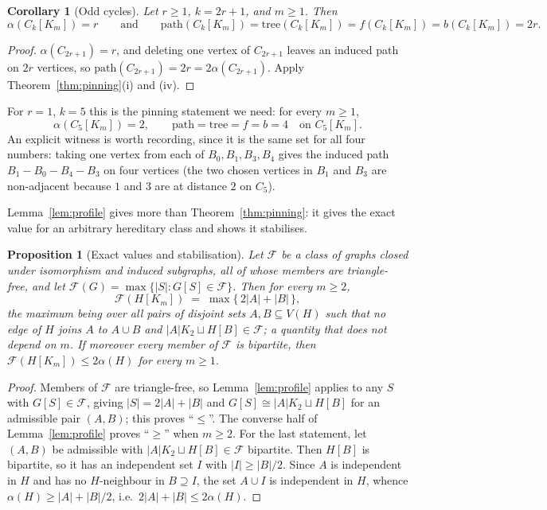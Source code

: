\documentclass[10pt,a4paper]{article}
\theoremstyle{plain}
\newtheorem{proposition}[theorem]{Proposition}
\newtheorem{corollary}[theorem]{Corollary}
\theoremstyle{definition}
\newcommand{\ind}{\alpha}
\newcommand{\forestnum}{f}
\newcommand{\bipnum}{b}
\newcommand{\treenum}{\mathrm{tree}}
\newcommand{\pathnum}{\mathrm{path}}
\newcommand{\blow}[2]{#1[K_{#2}]}
\begin{document}
\begin{corollary}[Odd cycles]\label{cor:oddcycle}
Let $r \ge 1$, $k = 2r+1$, and $m \ge 1$. Then
\[
\ind(C_k[K_m]) = r
\qquad\text{and}\qquad
\pathnum(C_k[K_m]) = \treenum(C_k[K_m]) = \forestnum(C_k[K_m]) = \bipnum(C_k[K_m]) = 2r .
\]
\end{corollary}

\begin{proof}
$\ind(C_{2r+1}) = r$, and deleting one vertex of $C_{2r+1}$ leaves an induced path on $2r$
vertices, so $\pathnum(C_{2r+1}) = 2r = 2\ind(C_{2r+1})$. Apply Theorem~\ref{thm:pinning}(i)
and (iv).
\end{proof}

For $r = 1$, $k = 5$ this is the pinning statement we need: for every $m \ge 1$,
\begin{equation}\label{eq:pin5}
\ind(\blow{C_5}{m}) = 2,
\qquad
\pathnum = \treenum = \forestnum = \bipnum = 4 \quad\text{on } \blow{C_5}{m}.
\end{equation}
An explicit witness is worth recording, since it is the same set for all four numbers: taking
one vertex from each of $B_0, B_1, B_3, B_4$ gives the induced path
$B_1 - B_0 - B_4 - B_3$ on four vertices (the two chosen vertices in $B_1$ and $B_3$ are
non-adjacent because $1$ and $3$ are at distance $2$ on $C_5$).

Lemma~\ref{lem:profile} gives more than Theorem~\ref{thm:pinning}: it gives the exact value for
an arbitrary hereditary class and shows it stabilises.

\begin{proposition}[Exact values and stabilisation]\label{prop:exact}
Let $\mathcal{F}$ be a class of graphs closed under isomorphism and induced subgraphs, all of
whose members are triangle-free, and let
$\mathcal{F}(G) = \max\{|S| : G[S] \in \mathcal{F}\}$. Then for every $m \ge 2$,
\[
\mathcal{F}(H[K_m]) \;=\; \max\big\{\, 2|A| + |B| \,\big\},
\]
the maximum being over all pairs of disjoint sets $A,B \subseteq V(H)$ such that no edge of $H$
joins $A$ to $A \cup B$ and $|A|K_2 \sqcup H[B] \in \mathcal{F}$;
a quantity that does not depend on $m$. If moreover every member of $\mathcal{F}$ is bipartite,
then $\mathcal{F}(H[K_m]) \le 2\ind(H)$ for every $m \ge 1$.
\end{proposition}

\begin{proof}
Members of $\mathcal{F}$ are triangle-free, so Lemma~\ref{lem:profile} applies to any $S$ with
$G[S] \in \mathcal{F}$, giving $|S| = 2|A| + |B|$ and $G[S] \cong |A|K_2 \sqcup H[B]$ for an
admissible pair $(A,B)$; this proves ``$\le$''. The converse half of Lemma~\ref{lem:profile}
proves ``$\ge$'' when $m \ge 2$. For the last statement, let $(A,B)$ be admissible with
$|A|K_2 \sqcup H[B] \in \mathcal{F}$ bipartite. Then $H[B]$ is bipartite, so it has an
independent set $I$ with $|I| \ge |B|/2$. Since $A$ is independent in $H$ and has no
$H$-neighbour in $B \supseteq I$, the set $A \cup I$ is independent in $H$, whence
$\ind(H) \ge |A| + |B|/2$, i.e.\ $2|A| + |B| \le 2\ind(H)$.
\end{proof}
\end{document}

